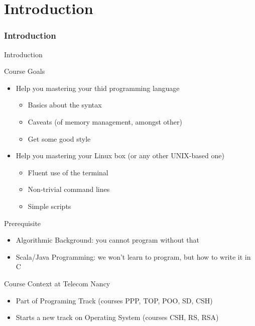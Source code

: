 \setcounter{part}{-1}
\part{Introduction}
\makeatletter{}\makeatother
\section{Introduction}
\begin{frame}{Introduction}
  \begin{block}{Course Goals}
    \begin{itemize}
    \item Help you mastering your thid programming language
      \begin{itemize}
      \item Basics about the syntax
      \item Caveats (of memory management, amongst other)
      \item Get some good style
      \end{itemize}
    \item Help you mastering your Linux box (or any other UNIX-based one)
      \begin{itemize}
      \item Fluent use of the terminal
      \item Non-trivial command lines
      \item Simple scripts
      \end{itemize}

    \end{itemize}
  \end{block}

  \begin{block}{Prerequisite}
    \begin{itemize}
    \item Algorithmic Background: you cannot program without that
    \item Scala/Java Programming: we won't learn to program, but how to write it in C
    \end{itemize}
  \end{block}

  \begin{block}{Course Context at Telecom Nancy}
    \begin{itemize}
    \item Part of Programing Track (courses PPP, TOP, POO, SD, CSH)
    \item Starts a new track on Operating System (courses CSH, RS, RSA)
    \end{itemize}
  \end{block}
\end{frame}

